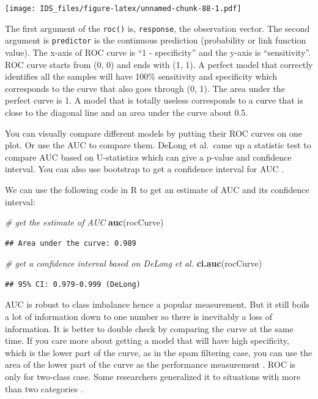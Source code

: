 \documentclass[12pt,]{krantz}
\makeatletter
\newenvironment{Shaded}{\begin{snugshade}}{\end{snugshade}}
\newcommand{\CommentTok}[1]{\textcolor[rgb]{0.37,0.37,0.37}{\textit{#1}}}
\newcommand{\KeywordTok}[1]{\textcolor[rgb]{0.27,0.27,0.27}{\textbf{#1}}}
\newcommand{\NormalTok}[1]{#1}
\newenvironment{kframe}{%
\medskip{}
\setlength{\fboxsep}{.8em}
 \def\at@end@of@kframe{}%
 \ifinner\ifhmode%
  \def\at@end@of@kframe{\end{minipage}}%
  \begin{minipage}{\columnwidth}%
 \fi\fi%
 \def\FrameCommand##1{\hskip\@totalleftmargin \hskip-\fboxsep
 \colorbox{shadecolor}{##1}\hskip-\fboxsep
     \hskip-\linewidth \hskip-\@totalleftmargin \hskip\columnwidth}%
 \MakeFramed {\advance\hsize-\width
   \@totalleftmargin\z@ \linewidth\hsize
   \@setminipage}}%
 {\par\unskip\endMakeFramed%
 \at@end@of@kframe}
\renewenvironment{Shaded}{\begin{kframe}}{\end{kframe}}
\makeatother
\begin{document}
\texttt{[image: IDS\_files/figure-latex/unnamed-chunk-88-1.pdf]}

The first argument of the \texttt{roc()} is, \texttt{response}, the observation vector. The second argument is \texttt{predictor} is the continuous prediction (probability or link function value). The x-axis of ROC curve is ``1 - specificity'' and the y-axis is ``sensitivity''. ROC curve starts from (0, 0) and ends with (1, 1). A perfect model that correctly identifies all the samples will have 100\% sensitivity and specificity which corresponds to the curve that also goes through (0, 1). The area under the perfect curve is 1. A model that is totally useless corresponds to a curve that is close to the diagonal line and an area under the curve about 0.5.

You can visually compare different models by putting their ROC curves on one plot. Or use the AUC to compare them. DeLong et al.~came up a statistic test to compare AUC based on U-statistics \citep{delong1988} which can give a p-value and confidence interval. You can also use bootstrap to get a confidence interval for AUC \citep{hall2004}.

We can use the following code in R to get an estimate of AUC and its confidence interval:

\begin{Shaded}
\begin{Highlighting}[]
\CommentTok{# get the estimate of AUC}
\KeywordTok{auc}\NormalTok{(rocCurve)}
\end{Highlighting}
\end{Shaded}

\begin{verbatim}
## Area under the curve: 0.989
\end{verbatim}

\begin{Shaded}
\begin{Highlighting}[]
\CommentTok{# get a confidence interval based on DeLong et al.}
\KeywordTok{ci.auc}\NormalTok{(rocCurve)}
\end{Highlighting}
\end{Shaded}

\begin{verbatim}
## 95% CI: 0.979-0.999 (DeLong)
\end{verbatim}

AUC is robust to class imbalance\citep{Provost1998, Fawcett2006} hence a popular measurement. But it still boils a lot of information down to one number so there is inevitably a loss of information. It is better to double check by comparing the curve at the same time. If you care more about getting a model that will have high specificity, which is the lower part of the curve, as in the spam filtering case, you can use the area of the lower part of the curve as the performance measurement \citep{McClish1989}. ROC is only for two-class case. Some researchers generalized it to situations with more than two categories \citep{Hand2001, Lachiche2003, Li2008}.
\end{document}
